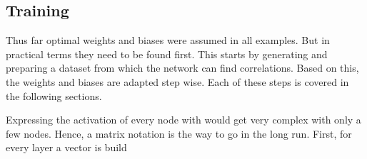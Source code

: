 \subsection{Training}
\label{sec:neural-networks-training}
Thus far optimal weights and biases were assumed in all examples.
But in practical terms they need to be found first.
This starts by generating and preparing a dataset from which the network can find correlations.
Based on this, the weights and biases are adapted step wise.
Each of these steps is covered in the following sections.





Expressing the activation of every node with  would get very complex with only a few nodes.
Hence, a matrix notation is the way to go in the long run.
First, for every layer a vector is build